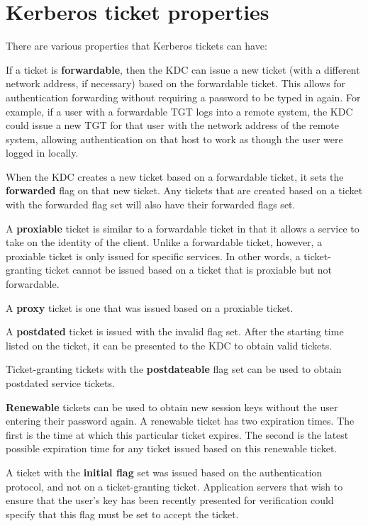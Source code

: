 \documentclass[letterpaper,10pt,english]{sphinxmanual}
\begin{document}
\section{Kerberos ticket properties}
\label{user/tkt_mgmt:kerberos-ticket-properties}
There are various properties that Kerberos tickets can have:

If a ticket is \textbf{forwardable}, then the KDC can issue a new ticket
(with a different network address, if necessary) based on the
forwardable ticket.  This allows for authentication forwarding without
requiring a password to be typed in again.  For example, if a user
with a forwardable TGT logs into a remote system, the KDC could issue
a new TGT for that user with the network address of the remote system,
allowing authentication on that host to work as though the user were
logged in locally.

When the KDC creates a new ticket based on a forwardable ticket, it
sets the \textbf{forwarded} flag on that new ticket.  Any tickets that are
created based on a ticket with the forwarded flag set will also have
their forwarded flags set.

A \textbf{proxiable} ticket is similar to a forwardable ticket in that it
allows a service to take on the identity of the client.  Unlike a
forwardable ticket, however, a proxiable ticket is only issued for
specific services.  In other words, a ticket-granting ticket cannot be
issued based on a ticket that is proxiable but not forwardable.

A \textbf{proxy} ticket is one that was issued based on a proxiable ticket.

A \textbf{postdated} ticket is issued with the invalid flag set.  After the
starting time listed on the ticket, it can be presented to the KDC to
obtain valid tickets.

Ticket-granting tickets with the \textbf{postdateable} flag set can be used
to obtain postdated service tickets.

\textbf{Renewable} tickets can be used to obtain new session keys without
the user entering their password again.  A renewable ticket has two
expiration times.  The first is the time at which this particular
ticket expires.  The second is the latest possible expiration time for
any ticket issued based on this renewable ticket.

A ticket with the \textbf{initial flag} set was issued based on the
authentication protocol, and not on a ticket-granting ticket.
Application servers that wish to ensure that the user's key has been
recently presented for verification could specify that this flag must
be set to accept the ticket.
\end{document}
